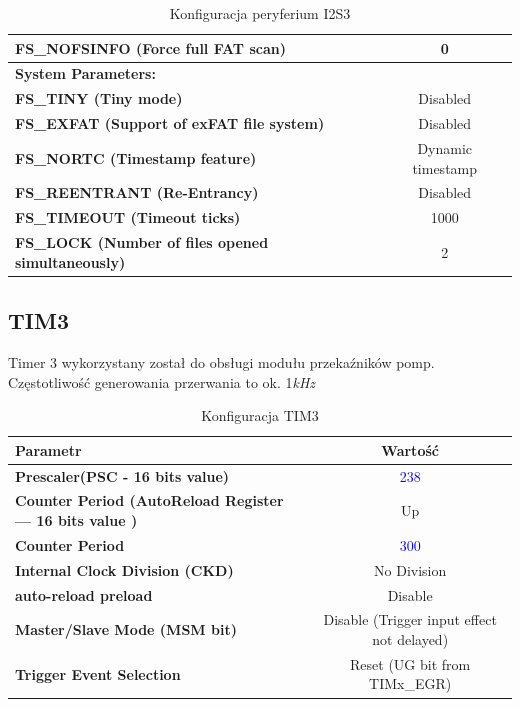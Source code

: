 \documentclass[10pt, a4paper]{article}
\begin{document}
\begin{table}[H]
\begin{tabular}{|l|c|}
\hline  \textbf{FS{\_}NOFSINFO (Force full FAT scan)} &  0\\
\hline  \textbf{System Parameters:} \\
\hline  \textbf{FS{\_}TINY (Tiny mode) } & Disabled\\
\hline  \textbf{FS{\_}EXFAT (Support of exFAT file system)} &  Disabled\\
\hline  \textbf{FS{\_}NORTC (Timestamp feature)} &  Dynamic timestamp\\
\hline  \textbf{FS{\_}REENTRANT (Re-Entrancy)} &  Disabled\\
\hline  \textbf{FS{\_}TIMEOUT (Timeout ticks) } & 1000\\
\hline  \textbf{FS{\_}LOCK (Number of files opened simultaneously)} &  2\\

	
	\hline

	\end{tabular}
	\caption{Konfiguracja peryferium I2S3}
	\label{tab:USART}
\end{table}
\newpage

\subsection{TIM3}
Timer 3 wykorzystany został do obsługi modułu przekaźników pomp. Częstotliwość generowania przerwania to ok. 1\emph{kHz}
 
\begin{table}[H]
    \centering
    \begin{tabular}{|l|c|} \hline
        \textbf{Parametr} & Wartość \\
        \hline
        \hline  \textbf{Prescaler(PSC - 16 bits value) }& \textcolor{blue}{238} \\
        \hline  \textbf{Counter Period (AutoReload Register --- 16 bits value )} & Up \\
        \hline  \textbf{Counter Period} & \textcolor{blue}{300} \\
        \hline  \textbf{Internal Clock Division (CKD) } & No Division\\
        \hline  \textbf{auto-reload preload} & Disable\\
        \hline  \textbf{Master/Slave Mode (MSM bit) } & Disable (Trigger input effect not delayed)
        \\
    \hline  \textbf{Trigger Event Selection} & Reset (UG bit from TIMx\_EGR)  \\
    \hline
 
    \end{tabular}
    \caption{Konfiguracja TIM3}
    \label{tab:TIM3}
\end{table}
\end{document}
